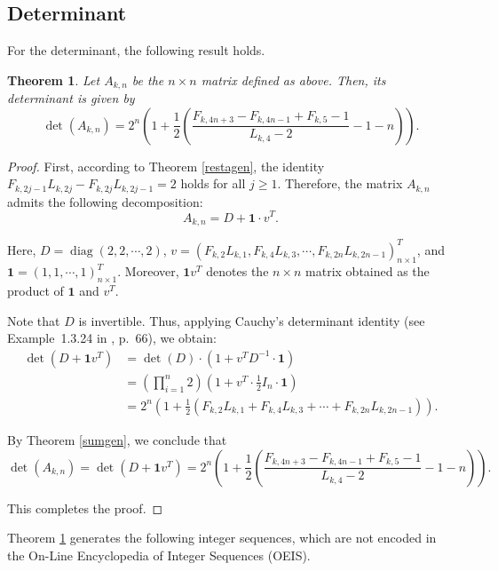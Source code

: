 \documentclass[11pt]{birkjour}
\newtheorem{thm}{Theorem}[section]
\theoremstyle{definition}
\theoremstyle{remark}
\numberwithin{equation}{section}
\begin{document}
\subsection{Determinant}
For the determinant, the following result holds.

\begin{thm}\label{detgen}
Let $A_{k,n}$ be the $n \times n$ matrix defined as above. Then, its determinant is given by
\[
\det(A_{k,n})=2^n\left(1+\frac{1}{2}\left( \frac{F_{k,4n+3}-F_{k,4n-1}+F_{k,5}-1}{L_{k,4}-2}-1-n\right)\right).
\]
\end{thm}


\begin{proof}
First, according to Theorem \ref{restagen}, the identity
$F_{k,2j-1}L_{k,2j}-F_{k,2j}L_{k,2j-1}=2$ holds for all $j \geq 1$. 
Therefore, the matrix $A_{k,n}$ admits the following decomposition:
\[
A_{k,n}=D+\mathbf{1}\cdot v^{T}.
\]

\noindent Here, $D=\operatorname{diag}(2,2,\cdots,2)$, 
$v=\left(F_{k,2}L_{k,1},F_{k,4}L_{k,3},\cdots, F_{k,2n}L_{k,2n-1} \right)^{T}_{n\times 1}$, 
and $\mathbf{1}=(1,1,\cdots,1)_{n\times 1}^{T}$. 
Moreover, $\mathbf{1}v^{T}$ denotes the $n \times n$ matrix obtained as the product of $\mathbf{1}$ and $v^{T}$.

\noindent Note that $D$ is invertible. Thus, applying Cauchy’s determinant identity 
(see Example~1.3.24 in \cite{HornJohnson}, p.~66), we obtain:
\begin{align*}
    \det(D+\mathbf{1}v^{T})&= \det(D)\cdot(1+v^{T}D^{-1}\cdot\mathbf{1})\\
    &=\left(\prod_{i=1}^{n} 2 \right) \left(1 + v^{T}\cdot \frac{1}{2}I_{n}\cdot \mathbf{1}\right)\\
    &= 2^{n}\left(  1+ \frac{1}{2}\left( F_{k,2}L_{k,1}+F_{k,4}L_{k,3}+\cdots+ F_{k,2n}L_{k,2n-1} \right) \right).
\end{align*}

\noindent By Theorem \ref{sumgen}, we conclude that
\[
\det(A_{k,n})=\det(D+\mathbf{1}v^{T})=2^n\left(1+\frac{1}{2}\left( \frac{F_{k,4n+3}-F_{k,4n-1}+F_{k,5}-1}{L_{k,4}-2}-1-n\right)\right).
\]

\noindent This completes the proof.
\end{proof}

\noindent Theorem \ref{detgen} generates the following integer sequences, which are not encoded in the On-Line Encyclopedia of Integer Sequences (OEIS).
\end{document}
